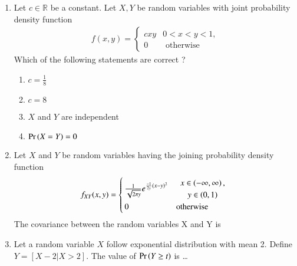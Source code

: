 \renewcommand{\theequation}{\theenumi}
\renewcommand{\thefigure}{\theenumi}
\renewcommand{\thetable}{\theenumi}
\begin{enumerate}[label=\thesection.\arabic*.,ref=\thesection.\theenumi]

\item Let $ c \in \mathbb{R} $ be a constant. Let $ X, Y$ be random variables with joint probability density function 
\begin{align}
f(x,y)  = 
\begin{cases}
cxy &  0<x<y<1,
\\
0 & \text{ otherwise }
\end{cases}
\label{eq:: joint_pdf}
\end{align}
Which of the following statements are correct ?
\begin{enumerate}
    \item $c = \frac{1}{8}$
    \item $ c= 8$
    \item $X $ and $ Y$ are independent
    \item $\Pr\left(X= Y\right) = 0 $
\end{enumerate}
\solution

%
\item Let $X$ and $Y$ be random variables having the joining probability density function
\begin{align}
f_{XY}(x,y)=
\begin{cases}
\frac{1}{\sqrt{2\pi y}}e^{\frac{-1}{2y}(x-y)^2} & 
\begin{array}{c}
x \in \left(-\infty,\infty\right), 
\\
y \in \left(0, 1\right) 
\end{array}
\\
0 &\text{otherwise}
\end{cases}
\label{eq:twoD/2}
\end{align}
The covariance between the random variables X and Y is
\\
%
\solution
%
\item Let a random variable $X$ follow exponential distribution with mean 2. Define $Y=[X-2|X>2]$. The value of $\Pr\left(Y \geq t\right)$ is \dots
\\
%
\solution

\end{enumerate}